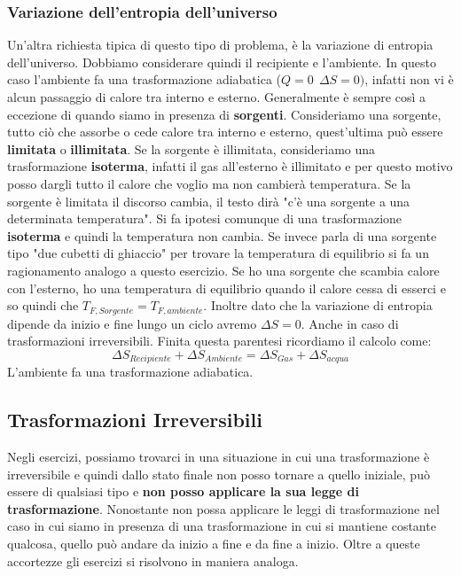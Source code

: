 \documentclass{article}
\numberwithin{equation}{subsection}
\begin{document}
\subsubsection{Variazione dell'entropia dell'universo}
Un'altra richiesta tipica di questo tipo di problema, è la variazione di entropia dell'universo. Dobbiamo considerare quindi il recipiente e l'ambiente. In questo caso l'ambiente fa una trasformazione adiabatica ($Q=0 \ \ \Delta S = 0)$, infatti non vi è alcun passaggio di calore tra interno e esterno. Generalmente è sempre così a eccezione di quando siamo in presenza di \textbf{sorgenti}. Consideriamo una sorgente, tutto ciò che assorbe o cede calore tra interno e esterno, quest'ultima può essere \textbf{limitata} o \textbf{illimitata}. Se la sorgente è illimitata, consideriamo una trasformazione \textbf{isoterma}, infatti il gas all'esterno è illimitato e per questo motivo posso dargli tutto il calore che voglio ma non cambierà temperatura. Se la sorgente è limitata il discorso cambia, il testo dirà "c'è una sorgente a una determinata temperatura". Si fa ipotesi comunque di una trasformazione \textbf{isoterma} e quindi la temperatura non cambia. Se invece parla di una sorgente tipo "due cubetti di ghiaccio" per trovare la temperatura di equilibrio si fa un ragionamento analogo a questo esercizio. Se ho una sorgente che scambia calore con l'esterno, ho una temperatura di equilibrio quando il calore cessa di esserci e so quindi che $T_{F, Sorgente}=T_{F, ambiente}$. Inoltre dato che la variazione di entropia dipende da inizio e fine lungo un ciclo avremo $\Delta S=0$. Anche in caso di trasformazioni irreversibili. Finita questa parentesi ricordiamo il calcolo come:
\begin{equation}
    \Delta S_{Recipiente}+\Delta S_{Ambiente}= \Delta S_{Gas}+\Delta S_{acqua} 
\end{equation}
L'ambiente fa una trasformazione adiabatica.
\subsection{Trasformazioni Irreversibili}
Negli esercizi, possiamo trovarci in una situazione in cui una trasformazione è irreversibile e quindi dallo stato finale non posso tornare a quello iniziale, può essere di qualsiasi tipo e \textbf{non posso applicare la sua legge di trasformazione}. Nonostante non possa applicare le leggi di trasformazione nel caso in cui siamo in presenza di una trasformazione in cui si mantiene costante qualcosa, quello può andare da inizio a fine e da fine a inizio. Oltre a queste accortezze gli esercizi si risolvono in maniera analoga.
\end{document}
